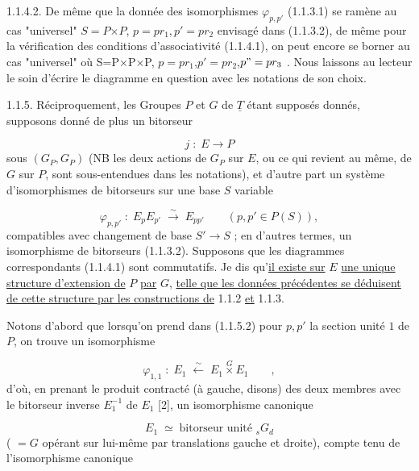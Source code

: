 1.1.4.2.  De même que la donnée des isomorphismes $\varphi_{p,p'}$ (1.1.3.1) se ramène au cas "universel" $S=P$$\times$$P$, $p=pr_1,p' = pr_2$ envisagé dans (1.1.3.2), de même
pour la vérification des conditions d'associativité (1.1.4.1), on peut encore se borner au cas "universel" où S=P$\times$P$\times$P, $p=pr_1$,$p'=pr_2$,$p"=pr_3$ . Nous laissons au lecteur le soin d'écrire le diagramme en question avec les notations de son choix.

1.1.5.  Réciproquement, les Groupes $P$ et $G$ de $\underline{T}$ étant supposés donnés, supposons donné de plus un bitorseur

\begin{equation}\tag{1.1.5.1}
j \; : \; E \longrightarrow P
\end{equation}
sous $(G_{P},G_{P})$ (NB les deux actions de $G_{P}$ sur $E$, ou ce qui revient au même, de $G$ sur $P$, sont sous-entendues dans les notations), et d'autre part un système d'isomorphismes de bitorseurs sur une base $S$ variable

\begin{equation}\tag{1.1.5.2}
\varphi_{p,p'} \; : \; E_{p}E_{p'} \;\overset{\sim}{\longrightarrow}\; E_{pp'} \qquad (p,p' \in P(S)),
\end{equation}
compatibles avec changement de base $S' \longrightarrow S$ ; en d'autres termes, un isomorphisme de bitorseurs (1.1.3.2). Supposons que les diagrammes correspondants (1.1.4.1) sont commutatifs. Je dis qu'\underline{il existe sur} $E$ \underline{une unique structure d'extension de} $P$ \underline{par} $G$, \underline{telle que les données précédentes se déduisent de cette structure par les constructions de} 1.1.2 \underline{et} 1.1.3.

Notons d'abord que lorsqu'on prend dans (1.1.5.2) pour $p,p'$ la section unité $1$ de $P$, on trouve un isomorphisme

\begin{equation}\tag{1.1.5.3}
\varphi_{1,1} \; : \; E_{1} \;\overset{\sim}{\longleftarrow}\; E_{1} \overset{G}{\times} E_{1} \qquad ,
\end{equation}
d'où, en prenant le produit contracté (à gauche, disons) des deux membres avec le bitorseur inverse $E_{1}^{-1}$ de $E_{1}$ [2], un isomorphisme canonique

\begin{equation}\tag{1.1.5.4}
E_{1} \;\simeq\; \text{bitorseur unité } {}_{s}G_{d}
\end{equation}
( $= G$ opérant sur lui-même par translations gauche et droite), compte tenu
de l'isomorphisme canonique

